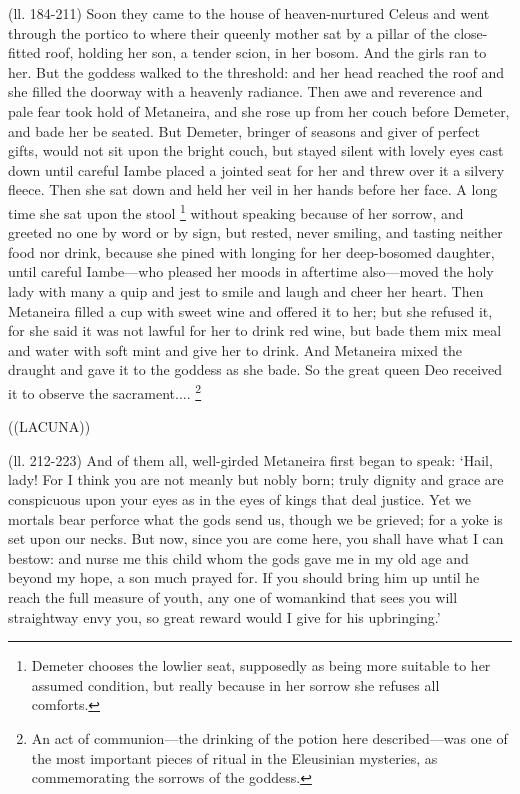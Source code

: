 (ll. 184-211) Soon they came to the house of heaven-nurtured Celeus and went
through the portico to where their queenly mother sat by a pillar of the
close-fitted roof, holding her son, a tender scion, in her bosom. And the girls
ran to her. But the goddess walked to the threshold: and her head reached the
roof and she filled the doorway with a heavenly radiance. Then awe and
reverence and pale fear took hold of Metaneira, and she rose up from her couch
before Demeter, and bade her be seated. But Demeter, bringer of seasons and
giver of perfect gifts, would not sit upon the bright couch, but stayed silent
with lovely eyes cast down until careful Iambe placed a jointed seat for her
and threw over it a silvery fleece. Then she sat down and held her veil in her
hands before her face. A long time she sat upon the stool \footnote{Demeter chooses the
lowlier seat, supposedly as being more suitable to her assumed condition, but
really because in her sorrow she refuses all comforts.} without speaking because of her
sorrow, and greeted no one by word or by sign, but rested, never smiling, and
tasting neither food nor drink, because she pined with longing for her
deep-bosomed daughter, until careful Iambe—who pleased her moods in
aftertime also—moved the holy lady with many a quip and jest to smile and
laugh and cheer her heart. Then Metaneira filled a cup with sweet wine and
offered it to her; but she refused it, for she said it was not lawful for her
to drink red wine, but bade them mix meal and water with soft mint and give her
to drink. And Metaneira mixed the draught and gave it to the goddess as she
bade. So the great queen Deo received it to observe the sacrament.... \footnote{An act of
communion—the drinking of the potion here described—was one of the
most important pieces of ritual in the Eleusinian mysteries, as commemorating
the sorrows of the goddess.}

((LACUNA))

(ll. 212-223) And of them all, well-girded Metaneira first began to speak:
‘Hail, lady! For I think you are not meanly but nobly born; truly dignity
and grace are conspicuous upon your eyes as in the eyes of kings that deal
justice. Yet we mortals bear perforce what the gods send us, though we be
grieved; for a yoke is set upon our necks. But now, since you are come here,
you shall have what I can bestow: and nurse me this child whom the gods gave me
in my old age and beyond my hope, a son much prayed for. If you should bring
him up until he reach the full measure of youth, any one of womankind that sees
you will straightway envy you, so great reward would I give for his
upbringing.’

